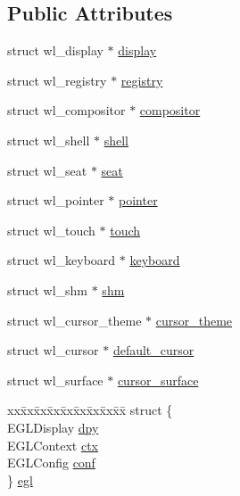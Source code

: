 \subsection*{Public Attributes}
\begin{DoxyCompactItemize}
\item 
struct wl\-\_\-display $\ast$ \hyperlink{structdisplay_aa8faf09631925e9221fd8a0c086ce75a}{display}
\item 
struct wl\-\_\-registry $\ast$ \hyperlink{structdisplay_a925781323f5c8eb84ef2225ed129de4b}{registry}
\item 
struct wl\-\_\-compositor $\ast$ \hyperlink{structdisplay_a41ba32dfde812165dda5b62885000c78}{compositor}
\item 
struct wl\-\_\-shell $\ast$ \hyperlink{structdisplay_a316cfc51e87338b2488233f5d96bd395}{shell}
\item 
struct wl\-\_\-seat $\ast$ \hyperlink{structdisplay_a9dd8fd9967beb6b3767bd93011373bb8}{seat}
\item 
struct wl\-\_\-pointer $\ast$ \hyperlink{structdisplay_acf252129525edb52af1883ed10267754}{pointer}
\item 
struct wl\-\_\-touch $\ast$ \hyperlink{structdisplay_a8adde40dc3f12d1a6967cf424e2284df}{touch}
\item 
struct wl\-\_\-keyboard $\ast$ \hyperlink{structdisplay_a06233e290c4ac294617401b22421691d}{keyboard}
\item 
struct wl\-\_\-shm $\ast$ \hyperlink{structdisplay_abb74b6ec549463cfd4b76f26b81b0309}{shm}
\item 
struct wl\-\_\-cursor\-\_\-theme $\ast$ \hyperlink{structdisplay_a144dd8ac007f779b6eaf1689e225cb35}{cursor\-\_\-theme}
\item 
struct wl\-\_\-cursor $\ast$ \hyperlink{structdisplay_a8cf09ba12cb9ca8cbfa28cf6ca7b668a}{default\-\_\-cursor}
\item 
struct wl\-\_\-surface $\ast$ \hyperlink{structdisplay_a88395d1fffcedd8b841a42e9bd6f7d59}{cursor\-\_\-surface}
\item 
\begin{tabbing}
xx\=xx\=xx\=xx\=xx\=xx\=xx\=xx\=xx\=\kill
struct \{\\
\>EGLDisplay \hyperlink{structdisplay_a8a1cbda15a286e41e89a85f158ce9311}{dpy}\\
\>EGLContext \hyperlink{structdisplay_a3420940a29a710e0e5ebd41ba462cc00}{ctx}\\
\>EGLConfig \hyperlink{structdisplay_a880aef9408b499f5b749541dc6e396c3}{conf}\\
\} \hyperlink{structdisplay_a8b8bc104c19ff228d476a377e572d9c7}{egl}\\


\end{tabbing}
\end{DoxyCompactItemize}
